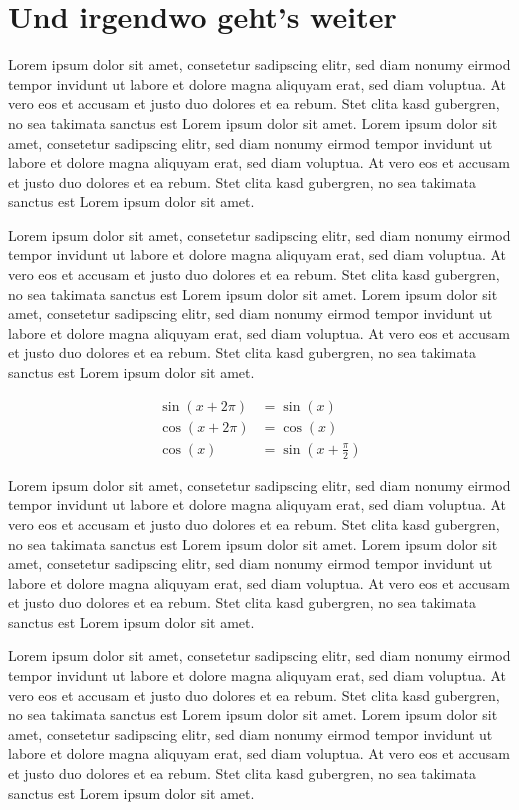 \chapter{Und irgendwo geht's weiter}
Lorem ipsum dolor sit amet, consetetur sadipscing elitr, sed diam nonumy eirmod tempor invidunt ut labore et dolore magna aliquyam erat, sed diam voluptua. At vero eos et accusam et justo duo dolores et ea rebum. Stet clita kasd gubergren, no sea takimata sanctus est Lorem ipsum dolor sit amet. Lorem ipsum dolor sit amet, consetetur sadipscing elitr, sed diam nonumy eirmod tempor invidunt ut labore et dolore magna aliquyam erat, sed diam voluptua. At vero eos et accusam et justo duo dolores et ea rebum. Stet clita kasd gubergren, no sea takimata sanctus est Lorem ipsum dolor sit amet.

Lorem ipsum dolor sit amet, consetetur sadipscing elitr, sed diam nonumy eirmod tempor invidunt ut labore et dolore magna aliquyam erat, sed diam voluptua. At vero eos et accusam et justo duo dolores et ea rebum. Stet clita kasd gubergren, no sea takimata sanctus est Lorem ipsum dolor sit amet. Lorem ipsum dolor sit amet, consetetur sadipscing elitr, sed diam nonumy eirmod tempor invidunt ut labore et dolore magna aliquyam erat, sed diam voluptua. At vero eos et accusam et justo duo dolores et ea rebum. Stet clita kasd gubergren, no sea takimata sanctus est Lorem ipsum dolor sit amet.

\begin{align}
  \sin(x+2\pi) &= \sin(x)\\
  \cos(x+2\pi) &= \cos(x)\\
  \cos(x) &= \sin\left(x+\frac{\pi}{2}\right)
\end{align}

Lorem ipsum dolor sit amet, consetetur sadipscing elitr, sed diam nonumy eirmod tempor invidunt ut labore et dolore magna aliquyam erat, sed diam voluptua. At vero eos et accusam et justo duo dolores et ea rebum. Stet clita kasd gubergren, no sea takimata sanctus est Lorem ipsum dolor sit amet. Lorem ipsum dolor sit amet, consetetur sadipscing elitr, sed diam nonumy eirmod tempor invidunt ut labore et dolore magna aliquyam erat, sed diam voluptua. At vero eos et accusam et justo duo dolores et ea rebum. Stet clita kasd gubergren, no sea takimata sanctus est Lorem ipsum dolor sit amet.

Lorem ipsum dolor sit amet, consetetur sadipscing elitr, sed diam nonumy eirmod tempor invidunt ut labore et dolore magna aliquyam erat, sed diam voluptua. At vero eos et accusam et justo duo dolores et ea rebum. Stet clita kasd gubergren, no sea takimata sanctus est Lorem ipsum dolor sit amet. Lorem ipsum dolor sit amet, consetetur sadipscing elitr, sed diam nonumy eirmod tempor invidunt ut labore et dolore magna aliquyam erat, sed diam voluptua. At vero eos et accusam et justo duo dolores et ea rebum. Stet clita kasd gubergren, no sea takimata sanctus est Lorem ipsum dolor sit amet.

